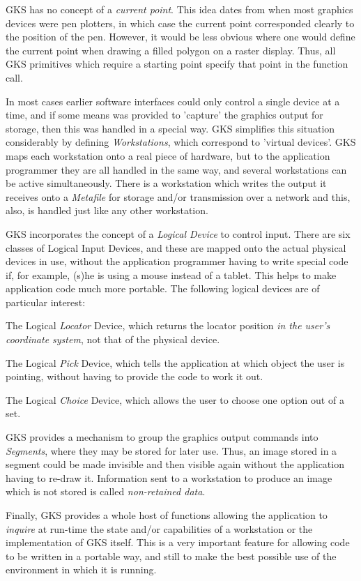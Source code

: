 \begin{OL}
\item GKS has no concept of a {\it current point}. This idea dates
from when most graphics devices were pen plotters, in which case the
current point corresponded clearly to the position of the pen.
However, it would be less obvious where one would define the current
point when drawing a filled polygon on a raster display.
Thus, all GKS primitives which require
a starting point specify that point in the function call.
\item In most cases earlier software interfaces could only control a single
device at a time, and if some means was provided to 'capture' the graphics
output for storage, then this was handled in a special way.
GKS simplifies this situation considerably by defining
{\it Workstations}, which correspond to 'virtual devices'.
GKS maps each workstation onto a real piece of hardware, but to the
application programmer they are all handled in the same way, and
several workstations can be active simultaneously.
There is a workstation which writes the output it receives onto a
{\it Metafile} for storage and/or transmission over a network
and this, also, is handled just like any other workstation.
\item GKS incorporates the concept of a {\it Logical Device} to
control input. There are six classes of Logical Input Devices, and these
are mapped onto the actual physical devices in use, without the application
programmer having to write special code if, for example, (s)he is using
a mouse instead of a tablet. This helps to make application code much
more portable. The following logical devices are of particular interest:
 \begin{OL}
\item The Logical {\it Locator} Device, which returns the locator position
{\it in the user's coordinate system}, not that of the physical device.
\item The Logical {\it Pick} Device, which tells the application
at which object the user is pointing, without having to provide the code to
work it out.
\item The Logical {\it Choice} Device, which allows the user to
choose one option out of a set.
 \end{OL}
\item GKS provides a mechanism to group the graphics output commands into
{\it Segments}, where they may be stored for later use.
Thus, an image stored in a segment could be made invisible and then visible
again without the application having to re-draw it.
Information sent to a workstation to produce an image which is not
stored is called {\it non-retained data}.
\item Finally, GKS provides a whole host of functions allowing the application
to {\it inquire} at run-time the state and/or capabilities of a
workstation or the implementation of GKS itself.
This is a very important feature for allowing code to be written in a
portable way, and still to make the best possible use of the environment in
which it is running.
\end{OL}
